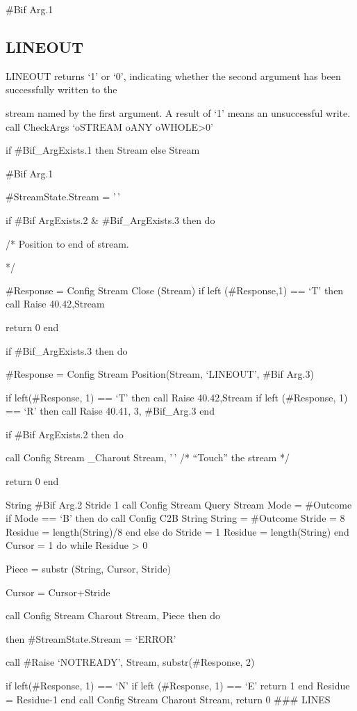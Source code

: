 \#Bif Arg.1

\subsection{LINEOUT}\label{lineout}

LINEOUT returns `1' or `0', indicating whether the second argument has
been successfully written to the

stream named by the first argument. A result of `1' means an
unsuccessful write. call CheckArgs `oSTREAM oANY oWHOLE\textgreater0'

if \#Bif\_ArgExists.1 then Stream else Stream

\#Bif Arg.1

\#StreamState.Stream = '\,'

if \#Bif ArgExists.2 \& \#Bif\_ArgExists.3 then do

/* Position to end of stream.

*/

\#Response = Config Stream Close (Stream) if left (\#Response,1) == `T'
then call Raise 40.42,Stream

return 0 end

if \#Bif\_ArgExists.3 then do

\#Response = Config Stream Position(Stream, `LINEOUT', \#Bif Arg.3)

if left(\#Response, 1) == `T' then call Raise 40.42,Stream if left
(\#Response, 1) == `R' then call Raise 40.41, 3, \#Bif\_Arg.3 end

if \#Bif ArgExists.2 then do

call Config Stream \_Charout Stream, '\,' /* ``Touch'' the stream */

return 0 end

String \#Bif Arg.2 Stride 1 call Config Stream Query Stream Mode =
\#Outcome if Mode == `B' then do call Config C2B String String =
\#Outcome Stride = 8 Residue = length(String)/8 end else do Stride = 1
Residue = length(String) end Cursor = 1 do while Residue \textgreater{}
0

Piece = substr (String, Cursor, Stride)

Cursor = Cursor+Stride

call Config Stream Charout Stream, Piece then do

then \#StreamState.Stream = `ERROR'

call \#Raise `NOTREADY', Stream, substr(\#Response, 2)

if left(\#Response, 1) == `N' if left (\#Response, 1) == `E' return 1
end Residue = Residue-1 end call Config Stream Charout Stream, return 0
\#\#\# LINES

